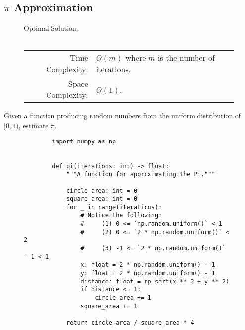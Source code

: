 
\subsection{\(\pi\) Approximation}

\begin{figure}[H]
    Optimal Solution:\\\\
    \begin{tabular}{rl}
        Time Complexity:& \(O(m)\) where \(m\) is the number of iterations.\\
        Space Complexity:& \(O(1)\).
    \end{tabular}
\end{figure}

Given a function producing random numbers from the uniform
distribution of \([0, 1)\), estimate \(\pi\).

\begin{figure}[H]
    \centering
    \begin{verbatim}
        import numpy as np


        def pi(iterations: int) -> float:
            """A function for approximating the Pi."""

            circle_area: int = 0
            square_area: int = 0
            for _ in range(iterations):
                # Notice the following:
                #     (1) 0 <= `np.random.uniform()` < 1
                #     (2) 0 <= `2 * np.random.uniform()` < 2
                #     (3) -1 <= `2 * np.random.uniform()`  - 1 < 1
                x: float = 2 * np.random.uniform() - 1
                y: float = 2 * np.random.uniform() - 1
                distance: float = np.sqrt(x ** 2 + y ** 2)
                if distance <= 1:
                    circle_area += 1
                square_area += 1

            return circle_area / square_area * 4
    \end{verbatim}
\end{figure}
